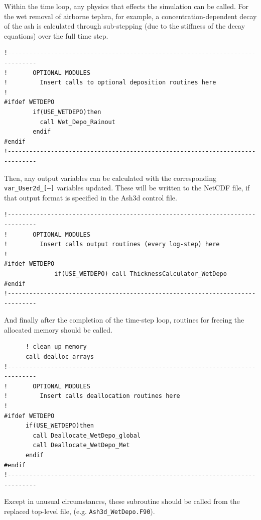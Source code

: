 Within the time loop, any physics that effects the simulation can be called.
For the wet removal of airborne tephra, for example, a concentration-dependent
decay of the ash is calculated through sub-stepping (due to the stiffness of the
decay equations) over the full time step.
\small
\begin{verbatim}
!------------------------------------------------------------------------------
!       OPTIONAL MODULES
!         Insert calls to optional deposition routines here
!
#ifdef WETDEPO
        if(USE_WETDEPO)then
          call Wet_Depo_Rainout
        endif
#endif
!------------------------------------------------------------------------------
\end{verbatim}
\normalsize
Then, any output variables can be calculated with the corresponding
\texttt{var\_User2d\_[---]} variables updated. These will be written to the
NetCDF file, if that output format is specified in the Ash3d control file.

\small
\begin{verbatim}
!------------------------------------------------------------------------------
!       OPTIONAL MODULES
!         Insert calls output routines (every log-step) here
!
#ifdef WETDEPO
              if(USE_WETDEPO) call ThicknessCalculator_WetDepo
#endif
!------------------------------------------------------------------------------
\end{verbatim}
\normalsize
And finally after the completion of the time-step loop, routines for freeing
the allocated memory should be called.
\small
\begin{verbatim}
      ! clean up memory
      call dealloc_arrays
!------------------------------------------------------------------------------
!       OPTIONAL MODULES
!         Insert calls deallocation routines here
!
#ifdef WETDEPO
      if(USE_WETDEPO)then
        call Deallocate_WetDepo_global
        call Deallocate_WetDepo_Met
      endif
#endif
!------------------------------------------------------------------------------
\end{verbatim}
\normalsize

Except in unusual circumstances, these subroutine should be called from the
replaced top-level file, (e.g. \texttt{Ash3d\_WetDepo.F90}).

